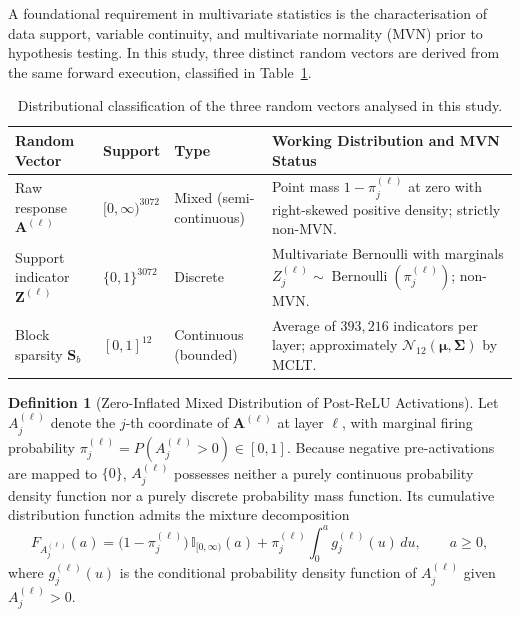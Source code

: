 \documentclass[12pt, a4paper, oneside]{report}
\theoremstyle{definition}
\newtheorem{definition}{Definition}[chapter]
\newcommand{\vect}[1]{\mathbf{#1}}
\newcommand{\mat}[1]{\mathbf{#1}}
\newcommand{\Ind}{\mathbb{I}}
\begin{document}
A foundational requirement in multivariate statistics is the characterisation of data support, variable continuity, and multivariate normality (MVN) prior to hypothesis testing. In this study, three distinct random vectors are derived from the same forward execution, classified in Table~\ref{tab:dist_taxonomy}.

\begin{table}[htbp]
    \centering
    \caption{Distributional classification of the three random vectors analysed in this study.}
    \label{tab:dist_taxonomy}
    \small
    \begin{tabularx}{\textwidth}{@{}l l l X@{}}
        \toprule
        \textbf{Random Vector} & \textbf{Support} & \textbf{Type} & \textbf{Working Distribution and MVN Status} \\
        \midrule
        Raw response $\vect{A}^{(\ell)}$ & $[0, \infty)^{3072}$ & Mixed (semi-continuous) & Point mass $1 - \pi_j^{(\ell)}$ at zero with right-skewed positive density; strictly non-MVN. \\
        Support indicator $\vect{Z}^{(\ell)}$ & $\{0, 1\}^{3072}$ & Discrete & Multivariate Bernoulli with marginals $Z_j^{(\ell)} \sim \operatorname{Bernoulli}(\pi_j^{(\ell)})$; non-MVN. \\
        Block sparsity $\vect{S}_b$ & $[0, 1]^{12}$ & Continuous (bounded) & Average of $393{,}216$ indicators per layer; approximately $\mathcal{N}_{12}(\boldsymbol{\mu}, \mat{\Sigma})$ by MCLT. \\
        \bottomrule
    \end{tabularx}
\end{table}

\begin{definition}[Zero-Inflated Mixed Distribution of Post-ReLU Activations]
Let $A_j^{(\ell)}$ denote the $j$-th coordinate of $\vect{A}^{(\ell)}$ at layer $\ell$, with marginal firing probability $\pi_j^{(\ell)} = P(A_j^{(\ell)} > 0) \in [0, 1]$. Because negative pre-activations are mapped to $\{0\}$, $A_j^{(\ell)}$ possesses neither a purely continuous probability density function nor a purely discrete probability mass function. Its cumulative distribution function admits the mixture decomposition
\begin{equation}
    F_{A_j^{(\ell)}}(a) = \bigl(1 - \pi_j^{(\ell)}\bigr)\,\Ind_{[0, \infty)}(a) + \pi_j^{(\ell)} \int_0^a g_j^{(\ell)}(u)\,du,
    \qquad a \ge 0,
    \label{eq:mixed_cdf}
\end{equation}
where $g_j^{(\ell)}(u)$ is the conditional probability density function of $A_j^{(\ell)}$ given $A_j^{(\ell)} > 0$.
\end{definition}
\end{document}
